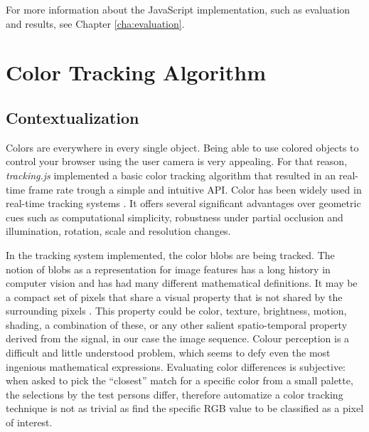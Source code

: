 For more information about the JavaScript \cite{International2009} implementation, such as evaluation and results, see Chapter \ref{cha:evaluation}.



\section{Color Tracking Algorithm} %
\label{sec:tracking_library_for_the_web:color_tracking_algorithm}

\subsection{Contextualization} %
\label{sub:tracking_library_for_the_web:color_tracking_algorithm:contextualization}

Colors are everywhere in every single object. Being able to use colored objects to control your browser using the user camera is very appealing. For that reason, \textit{tracking.js} implemented a basic color tracking algorithm that resulted in an real-time frame rate trough a simple and intuitive API.
Color has been widely used in real-time tracking systems \cite{Paschos2001}. It offers several significant advantages over geometric cues such as computational simplicity, robustness under partial occlusion and illumination, rotation, scale and resolution changes.

In the tracking system implemented, the color blobs are being tracked. The notion of blobs as a representation for image features has a long history in computer vision and has had many different mathematical definitions. It may be a compact set of pixels that share a visual property that is not shared by the surrounding pixels \cite{Kravtchenko1999}. This property could be color, texture, brightness, motion, shading, a combination of these, or any other salient spatio-temporal property derived from the signal, in our case the image sequence.
Colour perception is a difficult and little understood problem, which seems to defy even the most ingenious mathematical expressions. Evaluating color differences is subjective: when asked to pick the ``closest'' match for a specific color from a small palette, the selections by the test persons differ, therefore automatize a color tracking technique is not as trivial as find the specific RGB \cite{Gonzalez2007} value to be classified as a pixel of interest.

